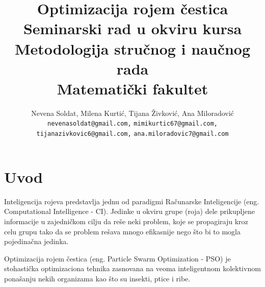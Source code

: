 \documentclass[a4paper]{article}
\begin{document}
\title{Optimizacija rojem čestica\\ \small{Seminarski rad u okviru kursa\\Metodologija stručnog i naučnog rada\\ Matematički fakultet}}

\author{Nevena Soldat, Milena Kurtić, Tijana Živković, Ana Miloradović\protect\\
\small{\texttt{nevenasoldat@gmail.com,}  \texttt{mimikurtic67@gmail.com,}} \\ \small{\texttt{tijanazivkovic6@gmail.com,} \texttt{ana.miloradovic7@gmail.com}}}


\maketitle


\tableofcontents

\newpage

\section{Uvod}
\label{sec:uvod}

Inteligencija rojeva predstavlja jednu od paradigmi Računarske Inteligencije (eng. Computational Intelligence - CI). Jedinke u okviru grupe (roja) dele prikupljene informacije u zajedničkom cilju da reše neki problem, koje se propagiraju kroz celu grupu tako da se problem rešava mnogo efikasnije nego što bi to mogla pojedinačna jedinka.

Optimizacija rojem čestica (eng. Particle Swarm Optimization - PSO) je stohastička optimizaciona tehnika zasnovana na veoma inteligentnom kolektivnom ponašanju nekih organizama kao što su insekti, ptice i ribe.
\end{document}
